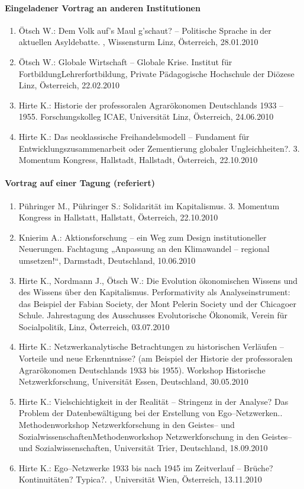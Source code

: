 \paragraph{Eingeladener Vortrag an anderen Institutionen}
\begin{enumerate}
	\item Ötsch W.: Dem Volk auf's Maul g'schaut? -- Politische Sprache in der aktuellen Asyldebatte. , Wissensturm Linz, Österreich, 28.01.2010
	\item Ötsch W.: Globale Wirtschaft -- Globale Krise. Institut für FortbildungLehrerfortbildung, Private Pädagogische Hochschule der Diözese Linz, Österreich, 22.02.2010
	\item Hirte K.: Historie der professoralen Agrarökonomen Deutschlands 1933 – 1955. Forschungskolleg ICAE, Universität Linz, Österreich, 24.06.2010
	\item Hirte K.: Das neoklassische Freihandelsmodell -- Fundament für Entwicklungszusammenarbeit oder Zementierung globaler Ungleichheiten?. 3. Momentum Kongress, Hallstadt, Hallstadt, Österreich, 22.10.2010
\end{enumerate}
\paragraph{Vortrag auf einer Tagung (referiert)}
\begin{enumerate}
	\item Pühringer M., Pühringer S.: Solidarität im Kapitalismus. 3. Momentum Kongress in Hallstatt, Hallstatt, Österreich, 22.10.2010
	\item Knierim A.: Aktionsforschung – ein Weg zum Design institutioneller Neuerungen. Fachtagung „Anpassung an den Klimawandel – regional umsetzen!“, Darmstadt, Deutschland, 10.06.2010
	\item Hirte K., Nordmann J., Ötsch W.: Die Evolution ökonomischen Wissens und des Wissens über den Kapitalismus. Performativity als Analyseinstrument: das Beispiel der Fabian Society, der Mont Pelerin Society und der Chicagoer Schule. Jahrestagung des Ausschusses Evolutorische Ökonomik, Verein für Socialpolitik, Linz, Österreich, 03.07.2010
	\item Hirte K.: Netzwerkanalytische Betrachtungen zu historischen Verläufen -- Vorteile und neue Erkenntnisse? (am Beispiel der Historie der professoralen Agrarökonomen Deutschlands 1933 bis 1955). Workshop Historische Netzwerkforschung, Universität Essen, Deutschland, 30.05.2010
	\item Hirte K.: Vielschichtigkeit in der Realität -- Stringenz in der Analyse? Das Problem der Datenbewältigung bei der Erstellung von Ego--Netzwerken.. Methodenworkshop Netzwerkforschung in den Geistes-- und SozialwissenschaftenMethodenworkshop Netzwerkforschung in den Geistes-- und Sozialwissenschaften, Universität Trier, Deutschland, 18.09.2010
	\item Hirte K.: Ego--Netzwerke 1933 bis nach 1945 im Zeitverlauf -- Brüche? Kontinuitäten? Typica?. , Universität Wien, Österreich, 13.11.2010
\end{enumerate}
